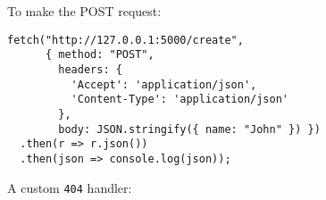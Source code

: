 \documentclass[../index.tex]{subfiles}
\begin{document}
\begin{frame}[fragile]{\currenttitle}
  To make the POST request: \\
  \vspace*{1em}

  \begin{lstlisting}[language=ES6,basicstyle=\ttfamily\footnotesize]
fetch("http://127.0.0.1:5000/create",
      { method: "POST",
        headers: {
          'Accept': 'application/json',
          'Content-Type': 'application/json'
        },
        body: JSON.stringify({ name: "John" }) })
  .then(r => r.json())
  .then(json => console.log(json));
  \end{lstlisting}
\end{frame}

\begin{frame}[fragile]{\currenttitle}
  A custom \texttt{404} handler:
\end{frame}


\end{document}
